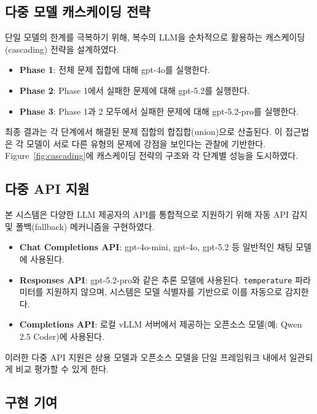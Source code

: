 \documentclass[sigplan,screen,review,anonymous]{acmart}
\begin{document}
\subsection{다중 모델 캐스케이딩 전략}

단일 모델의 한계를 극복하기 위해, 복수의 LLM을 순차적으로 활용하는 캐스케이딩(cascading) 전략을 설계하였다.

\begin{itemize}
    \item \textbf{Phase 1}: 전체 문제 집합에 대해 gpt-4o를 실행한다.
    \item \textbf{Phase 2}: Phase 1에서 실패한 문제에 대해 gpt-5.2를 실행한다.
    \item \textbf{Phase 3}: Phase 1과 2 모두에서 실패한 문제에 대해 gpt-5.2-pro를 실행한다.
\end{itemize}

최종 결과는 각 단계에서 해결된 문제 집합의 합집합(union)으로 산출된다. 이 접근법은 각 모델이 서로 다른 유형의 문제에 강점을 보인다는 관찰에 기반한다. Figure~\ref{fig:cascading}에 캐스케이딩 전략의 구조와 각 단계별 성능을 도시하였다.

\subsection{다중 API 지원}

본 시스템은 다양한 LLM 제공자의 API를 통합적으로 지원하기 위해 자동 API 감지 및 폴백(fallback) 메커니즘을 구현하였다.

\begin{itemize}
    \item \textbf{Chat Completions API}: gpt-4o-mini, gpt-4o, gpt-5.2 등 일반적인 채팅 모델에 사용된다.
    \item \textbf{Responses API}: gpt-5.2-pro와 같은 추론 모델에 사용된다. \texttt{temperature} 파라미터를 지원하지 않으며, 시스템은 모델 식별자를 기반으로 이를 자동으로 감지한다.
    \item \textbf{Completions API}: 로컬 vLLM 서버에서 제공하는 오픈소스 모델(예: Qwen 2.5 Coder)에 사용된다.
\end{itemize}

이러한 다중 API 지원은 상용 모델과 오픈소스 모델을 단일 프레임워크 내에서 일관되게 비교 평가할 수 있게 한다.

\subsection{구현 기여}
\end{document}
